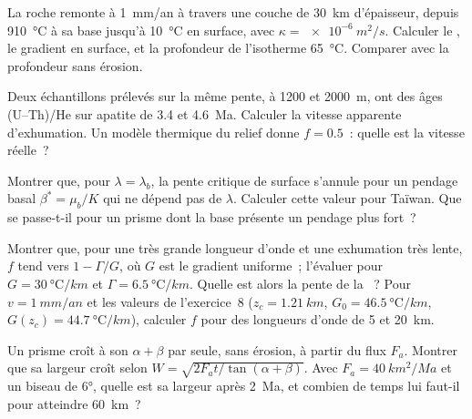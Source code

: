 \begin{exercise}[$\star\star$]\label{exo:b3:orogenic-wedges:8}
La roche remonte à \qty{1}{mm/an} à travers une couche de \qty{30}{km} d'épaisseur, depuis
\qty{910}{\celsius} à sa base jusqu'à \qty{10}{\celsius} en surface, avec
$\kappa = \qty{e-6}{m^2/s}$. Calculer le , le gradient en surface,
et la profondeur de l'isotherme \qty{65}{\celsius}. Comparer avec la profondeur
sans érosion.
\end{exercise}

\begin{exercise}[$\star\star$]\label{exo:b3:orogenic-wedges:9}
Deux échantillons prélevés sur la même pente, à 1200 et \qty{2000}{m}, ont des âges (U--Th)/He sur apatite de 3.4 et
\qty{4.6}{Ma}. Calculer la vitesse apparente d'exhumation. Un modèle
thermique du relief donne $f = 0.5$~: quelle est la vitesse réelle~?
\end{exercise}

\begin{exercise}[$\star\star\star$]\label{exo:b3:orogenic-wedges:10}
Montrer que, pour $\lambda = \lambda_b$, la pente critique de surface s'annule pour un
pendage basal $\beta^* = \mu_b/K$ qui ne dépend pas de $\lambda$. Calculer cette valeur pour
Taïwan. Que se passe-t-il pour un prisme dont la base présente un pendage plus fort~?
\end{exercise}

\begin{exercise}[$\star\star\star$]\label{exo:b3:orogenic-wedges:11}
Montrer que, pour une très grande longueur d'onde et une exhumation très lente, $f$ tend vers
$1 - \Gamma/G$, où $G$ est le gradient uniforme~; l'évaluer pour $G =
\qty{30}{\celsius/km}$ et $\Gamma = \qty{6.5}{\celsius/km}$. Quelle est alors la
pente de la ~? Pour $v = \qty{1}{mm/an}$ et les
valeurs de l'exercice~8 ($z_c = \qty{1.21}{km}$, $G_0 = \qty{46.5}{\celsius/km}$,
$G(z_c) = \qty{44.7}{\celsius/km}$), calculer $f$ pour des longueurs d'onde de 5 et
\qty{20}{km}.
\end{exercise}

\begin{exercise}[$\star\star\star$]\label{exo:b3:orogenic-wedges:12}
Un prisme croît à son  $\alpha + \beta$ par
 seule, sans érosion, à partir du flux $F_a$. Montrer que sa largeur croît selon
$W = \sqrt{2F_at/\tan(\alpha + \beta)}$. Avec $F_a = \qty{40}{km^2/Ma}$ et
un biseau de \ang{6}, quelle est sa largeur après \qty{2}{Ma}, et combien de temps
lui faut-il pour atteindre \qty{60}{km}~?
\end{exercise}

